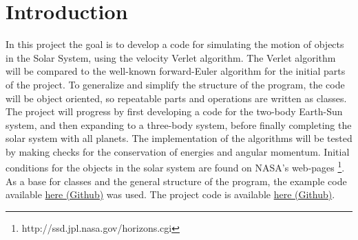 \section{Introduction}
In this project the goal is to develop a code for simulating the motion of objects in the 
Solar System, using the velocity Verlet algorithm. 
The Verlet algorithm will be compared to the well-known forward-Euler 
algorithm for the initial parts of the project.  
To generalize and simplify the structure of the program, 
the code will be object oriented, so repeatable parts and operations are written as classes.
The project will progress by first developing a code for the two-body Earth-Sun system, and then
expanding to a three-body system, before finally completing the solar system with all planets.
The implementation of the algorithms will be tested by making checks for the conservation of 
energies and angular momentum. Initial conditions for the objects in the solar system are
found on NASA's web-pages \footnote{http://ssd.jpl.nasa.gov/horizons.cgi}.
\newline
As a base for classes and the general structure of the program, the example code available
\href{https://github.com/andeplane/solar-system}{here (Github)} was used.
\newline
The project code is available 
\href{https://github.com/copperwire/project3/tree/master/project_3}{here (Github)}.
